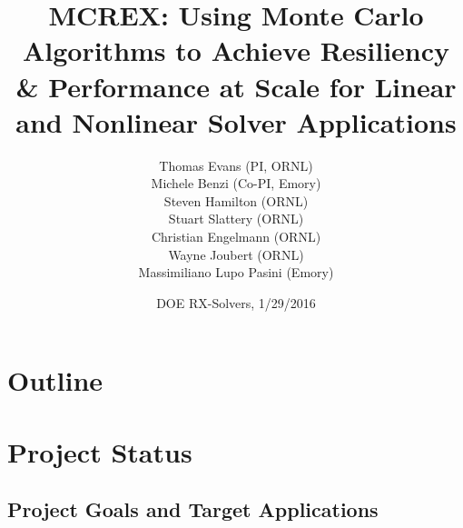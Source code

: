 \documentclass{beamer}
\title[MCREX]{MCREX: Using Monte Carlo Algorithms to Achieve Resiliency \&
  Performance at Scale for Linear and Nonlinear Solver Applications}
\author[Evans et al.]{Thomas Evans (PI, ORNL)\\
  Michele Benzi (Co-PI, Emory)\\
  Steven Hamilton (ORNL)\\
  Stuart Slattery (ORNL)\\
  Christian Engelmann (ORNL)\\
  Wayne Joubert (ORNL)\\
  Massimiliano Lupo Pasini (Emory) }
\date[DOE, 2016]{DOE RX-Solvers, 1/29/2016}
\begin{document}

{
  \begin{frame}[plain]
    \titlepage
  \end{frame}
}

\section*{Outline}

\begin{frame}
  \tableofcontents
\end{frame}

\section{Project Status}
\subsection{Project Goals and Target Applications}
\end{document}
